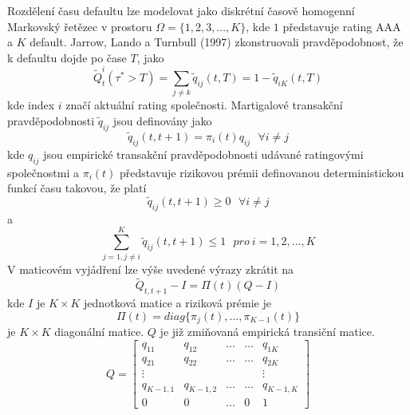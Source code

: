 Rozdělení času defaultu lze modelovat jako diskrétní časově homogenní Markovský řetězec v prostoru $\Omega =\{1, 2, 3, ..., K\}$, kde $1$ představuje rating AAA a $K$ default. Jarrow, Lando a Turnbull (1997) zkonstruovali pravděpodobnost, že k defaultu dojde po čase $T$, jako
\begin{equation}
\tilde{Q}_t^i (\tau^* > T) = \sum_{j \neq k} \tilde{q}_{ij}(t,T)=1 - \tilde{q}_{iK}(t,T)
\end{equation}
kde index $i$ značí aktuální rating společnosti. Martigalové transakční pravděpodobnosti $\tilde{q}_{ij}$ jsou definovány jako
\begin{equation}
\tilde{q}_{ij}(t, t+1) = \pi_i(t)q_{ij} ~~~ \forall i \neq j
\end{equation}
kde $q_{ij}$ jsou empirické transakční pravděpodobnosti udávané ratingovými společnostmi a $\pi_i(t)$ představuje rizikovou prémii definovanou deterministickou funkcí času takovou, že platí
\begin{equation}
\tilde{q}_{ij}(t, t+1) \ge 0  ~~~ \forall i \neq j
\end{equation}
a
\begin{equation}
\sum_{j=1, j \neq i}^K\tilde{q}_{ij}(t, t+1) \le 1 ~~~ pro~i = 1, 2, ..., K
\end{equation}
V maticovém vyjádření lze výše uvedené výrazy zkrátit na
\begin{equation}
\tilde{Q}_{t, t + 1} - I = \Pi(t)(Q - I)
\end{equation}
kde $I$ je $K \times K$ jednotková matice a riziková prémie je
\begin{equation}
\Pi(t) = diag\{\pi_j(t), ..., \pi_{K-1}(t)\}
\end{equation}
je $K \times K$ diagonální matice. $Q$ je již zmiňovaná empirická transiční matice.
\begin{equation}
Q = \left[
\begin{array}{ccccc}
q_{11} & q_{12} & \dots & \dots & q_{1K}\\
q_{21} & q_{22} & \dots & \dots & q_{2K}\\
\vdots & & & & \vdots\\
q_{K-1,1} & q_{K-1, 2} & \dots & \dots & q_{K-1, K}\\
0 & 0 & \dots & 0 & 1
\end{array}
\right]
\end{equation}
